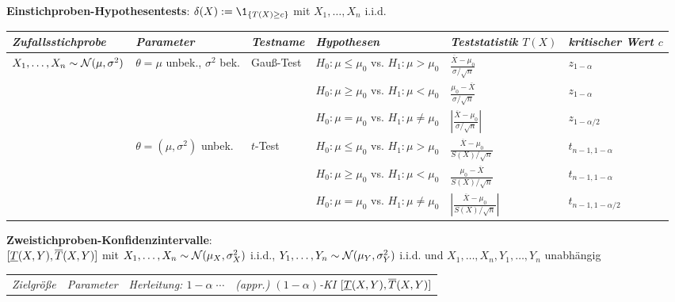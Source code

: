\begin{landscape}
{\begin{tabular}{lllll}
    \bottomrule
\end{tabular}}

\textbf{Einstichproben-Hypothesentests}:
$\delta(X) := \1_{\{T(X) \ge c\}}$ mit $X_1, \dotsc, X_n$ i.i.d.

{\small\begin{tabular}{llllll}
    \toprule
    \emph{Zufallsstichprobe} &
    \emph{Parameter} &
    \emph{Testname} &
    \emph{Hypothesen} &
    \emph{Teststatistik $T(X)$} &
    \emph{kritischer Wert $c$}\\
    
    \midrule
    $X_1, \dotsc, X_n \sim \mathcal{N}(\mu, \sigma^2)$ &
    $\theta = \mu$ unbek., $\sigma^2$ bek. &
    Gauß-Test &
    $H_0\colon \mu \le \mu_0$ vs. $H_1\colon \mu > \mu_0$ &
    $\frac{\overline{X} - \mu_0}{\sigma/\sqrt{n}}$ &
    $z_{1-\alpha}$\\
    \cmidrule(r){4-6}
    &&& $H_0\colon \mu \ge \mu_0$ vs. $H_1\colon \mu < \mu_0$ &
    $\frac{\mu_0 - \overline{X}}{\sigma/\sqrt{n}}$ &
    $z_{1-\alpha}$\\
    \cmidrule(r){4-6}
    &&& $H_0\colon \mu = \mu_0$ vs. $H_1\colon \mu \not= \mu_0$ &
    $\left|\frac{\overline{X} - \mu_0}{\sigma/\sqrt{n}}\right|$ &
    $z_{1-\alpha/2}$\\
    \cmidrule(r){2-6}
    & $\theta = (\mu, \sigma^2)$ unbek. &
    $t$-Test &
    $H_0\colon \mu \le \mu_0$ vs. $H_1\colon \mu > \mu_0$ &
    $\frac{\overline{X} - \mu_0}{S(X)/\sqrt{n}}$ &
    $t_{n-1,1-\alpha}$\\
    \cmidrule(r){4-6}
    &&& $H_0\colon \mu \ge \mu_0$ vs. $H_1\colon \mu < \mu_0$ &
    $\frac{\mu_0 - \overline{X}}{S(X)/\sqrt{n}}$ &
    $t_{n-1,1-\alpha}$\\
    \cmidrule(r){4-6}
    &&& $H_0\colon \mu = \mu_0$ vs. $H_1\colon \mu \not= \mu_0$ &
    $\left|\frac{\overline{X} - \mu_0}{S(X)/\sqrt{n}}\right|$ &
    $t_{n-1,1-\alpha/2}$\\
    
    \bottomrule
\end{tabular}}

\pagebreak

\textbf{Zweistichproben-Konfidenzintervalle}:\\
$[\underline{T}(X, Y), \overline{T}(X, Y)]$ mit $X_1, \dotsc, X_n  \sim \mathcal{N}(\mu_X, \sigma_X^2)$ i.i.d.,
$Y_1, \dotsc, Y_n \sim \mathcal{N}(\mu_Y, \sigma_Y^2)$ i.i.d. und
$X_1, \dotsc, X_n, Y_1, \dotsc, Y_n$ unabhängig

{\small\begin{tabular}{llll}
    \toprule
    \emph{Zielgröße} &
    \emph{Parameter} &
    \emph{Herleitung: $1 - \alpha\; \cdots$} &
    \emph{(appr.) $(1-\alpha)$-KI $[\underline{T}(X, Y), \overline{T}(X, Y)]$}\\
    

\end{tabular}}
\end{landscape}
